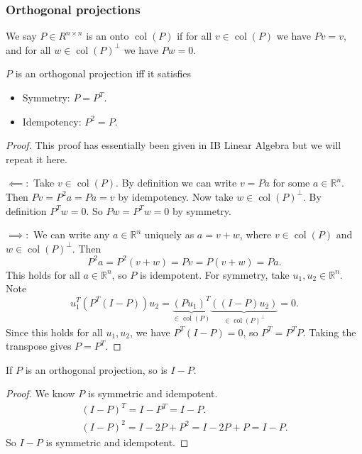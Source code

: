 \documentclass[egregdoesnotlikesansseriftitles,a4paper]{scrartcl}
\begin{document}
\subsubsection*{Orthogonal projections}
\begin{definition*}
      We say $P \in R^{n \times n}$ is an  onto $\operatorname{col}(P)$ if for all $v \in \operatorname{col}(P)$ we have $Pv =v $, and for all $w \in \operatorname{col}(P)^\perp$ we have $Pw =0$.
\end{definition*}
\begin{proposition}
      $P$ is an orthogonal projection iff it satisfies 
      \begin{itemize}
           \item Symmetry: $P=P^T$.
           \item Idempotency: $P^2=P$.
      \end{itemize}
      \begin{proof}
            This proof has essentially been given in IB Linear Algebra but we will repeat it here.

           \underline{$\impliedby:$} Take $v \in \operatorname{col}(P)$. By definition we can write $v=Pa $ for some $a \in \mathbb{R}^{n}$. Then $Pv = P^2 a= Pa =v$ by idempotency. Now take $w \in \operatorname{col}(P)^{\perp}$. By definition $P^{T}w=0$. So $Pw =P^Tw=0$ by symmetry.
           
           \underline{$\implies :$} We can write any $a \in \mathbb{R}^{n} $ uniquely as $a=v+w $, where $v \in \operatorname{col}(P)$ and $w \in \operatorname{col}(P)^{\perp}$. Then \[
           P^2 a = P^2 (v+w)=Pv= P (v+w)=Pa
           .\] This holds for all $a \in \mathbb{R}^{n} $, so $P$ is idempotent. For symmetry, take $u_1 , u_2 \in \mathbb{R}^{n} $. Note \[
           u_1^T (P^T (I-P))u_2 =\underbrace{(P u_1 )^{T}}_{\in \operatorname{col}(P)} \underbrace{ ((I-P)u_2 )}_{\in \operatorname{col}(P)^{\perp}} =0
           .\] Since this holds for all $u_1 ,u_2 $, we have $P^{T}(I-P)=0$, so $P^{T}=P^{T}P$. Taking the transpose gives $P=P^T$.
      \end{proof}
\end{proposition}
\begin{corollary}
      If $P$ is an orthogonal projection, so is $I-P$.
      \begin{proof}
            We know $P$ is symmetric and idempotent.
            \begin{align*}
                 (I-P)^T=I-P^T=I-P.\\
                 (I-P)^2=I -2P +P^2=I-2P +P=I-P.
            \end{align*}
            So $I-P$ is symmetric and idempotent.
      \end{proof}
\end{corollary}
\end{document}
